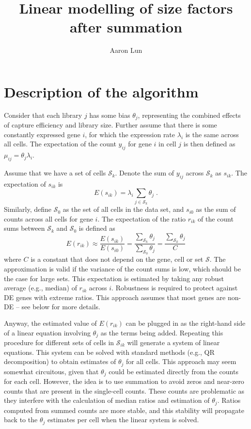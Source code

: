 \documentclass{article}
\title{Linear modelling of size factors after summation}
\author{Aaron Lun}
\begin{document}
\maketitle

\section{Description of the algorithm}
Consider that each library $j$ has some bias $\theta_j$, representing the combined effects of capture efficiency and library size.
Further assume that there is some constantly expressed gene $i$, for which the expression rate $\lambda_i$ is the same across all cells.
The expectation of the count $y_{ij}$ for gene $i$ in cell $j$ is then defined as $\mu_{ij} = \theta_j\lambda_i$.

Assume that we have a set of cells $\mathcal{S}_k$.
Denote the sum of $y_{ij}$ across $\mathcal{S}_k$ as $s_{ik}$.
The expectation of $s_{ik}$ is
\[
    E(s_{ik}) = \lambda_i \sum_{j \in \mathcal{S}_k} \theta_j \;.
\]
Similarly, define $\mathcal{S}_0$ as the set of all cells in the data set, and $s_{i0}$ as the sum of counts across all cells for gene $i$.
The expectation of the ratio $r_{ik}$ of the count sums between $\mathcal{S}_k$ and $\mathcal{S}_0$ is defined as
\[
    E(r_{ik}) \approx \frac{E(s_{ik})}{E(s_{i0})} = \frac{\sum_{\mathcal{S}_k} \theta_j}{\sum_{\mathcal{S}_0} \theta_j} = \frac{\sum_{\mathcal{S}_k} \theta_j}{C}
\]
where $C$ is a constant that does not depend on the gene, cell or set $\mathcal{S}$.
The approximation is valid if the variance of the count sums is low, which should be the case for large sets.
This expectation is estimated by taking any robust average (e.g., median) of $r_{ik}$ across $i$.
Robustness is required to protect against DE genes with extreme ratios.
This approach assumes that most genes are non-DE -- see below for more details.

Anyway, the estimated value of $E(r_{ik})$ can be plugged in as the right-hand side of a linear equation involving $\theta_j$ as the terms being added.
Repeating this procedure for different sets of cells in $\mathcal{S}_{ik}$ will generate a system of linear equations.
This system can be solved with standard methods (e.g., QR decomposition) to obtain estimates of $\theta_j$ for all cells.
This approach may seem somewhat circuitous, given that $\theta_j$ could be estimated directly from the counts for each cell.
However, the idea is to use summation to avoid zeros and near-zero counts that are present in the single-cell counts.
These counts are problematic as they interfere with the calculation of median ratios and estimation of $\theta_j$.
Ratios computed from summed counts are more stable, and this stability will propagate back to the $\theta_j$ estimates per cell when the linear system is solved.
\end{document}
